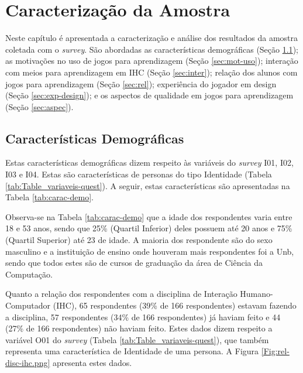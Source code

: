 \chapter{Caracterização da Amostra}
\label{chap:result}

Neste capítulo é apresentada a caracterização e análise dos resultados da amostra coletada com o \textit{survey}. São abordadas as características demográficas (Seção \ref{sec:demo}); as motivações no uso de jogos para aprendizagem (Seção \ref{sec:mot-uso}); interação com meios para aprendizagem em IHC (Seção \ref{sec:inter}); relação dos alunos com jogos para aprendizagem (Seção \ref{sec:rel}); experiência do jogador em design (Seção \ref{sec:exp-design}); e os aspectos de qualidade em jogos para aprendizagem (Seção \ref{sec:aspec}).

\section{Características Demográficas}
\label{sec:demo}
Estas características demográficas dizem respeito às variáveis do \textit{survey} I01, I02, I03 e I04. Estas são características de personas do tipo Identidade (Tabela \ref{tab:Table_variaveis-quest}). A seguir, estas características são apresentadas na Tabela \ref{tab:carac-demo}.  



Observa-se na Tabela \ref{tab:carac-demo} que a idade dos respondentes varia entre 18 e 53 anos, sendo que 25\% (Quartil Inferior) deles possuem até 20 anos e 75\% (Quartil Superior) até 23 de idade. A maioria dos respondente são do sexo masculino e a instituição de ensino onde houveram mais respondentes foi a Unb, sendo que todos estes são de cursos de graduação da área de Ciência da Computação.

Quanto a relação dos respondentes com a disciplina de Interação Humano-Computador (IHC), 65 respondentes (39\% de 166 respondentes) estavam fazendo a disciplina, 57 respondentes (34\% de 166 respondentes) já haviam feito e 44 (27\% de 166 respondentes) não haviam feito. Estes dados dizem respeito a variável O01 do \textit{survey} (Tabela \ref{tab:Table_variaveis-quest}), que também representa uma característica de Identidade de uma persona. A Figura \ref{Fig:rel-disc-ihc.png} apresenta estes dados.

\newpage

